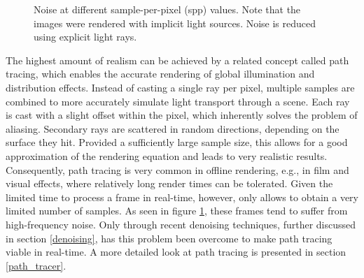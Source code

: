 \begin{figure}[H]
    \centering
    \hfill
    \hfill
    \hfill
    \caption{Noise at different sample-per-pixel (spp) values. Note that the images were rendered with implicit light sources. Noise is reduced using explicit light rays.}
    \label{fig:noise}
\end{figure}

The highest amount of realism can be achieved by a related concept called path tracing\cite{cook_distributed_1984, kajiya_rendering_1986}, which enables the accurate rendering of global illumination and distribution effects. Instead of casting a single ray per pixel, multiple samples are combined to more accurately simulate light transport through a scene. Each ray is cast with a slight offset within the pixel, which inherently solves the problem of aliasing. Secondary rays are scattered in random directions, depending on the surface they hit. Provided a sufficiently large sample size, this allows for a good approximation of the rendering equation\cite{kajiya_rendering_1986} and leads to very realistic results. Consequently, path tracing is very common in offline rendering, e.g., in film\cite{keller2015path_tracing_revolution} and visual effects, where relatively long render times can be tolerated. Given the limited time to process a frame in real-time, however, only allows to obtain a very limited number of samples. As seen in figure \ref{fig:noise}, 
these frames tend to suffer from high-frequency noise. Only through recent denoising techniques, further discussed in section \ref{denoising}, has this problem been overcome to make path tracing viable in real-time. A more detailed look at path tracing is presented in section \ref{path_tracer}.
